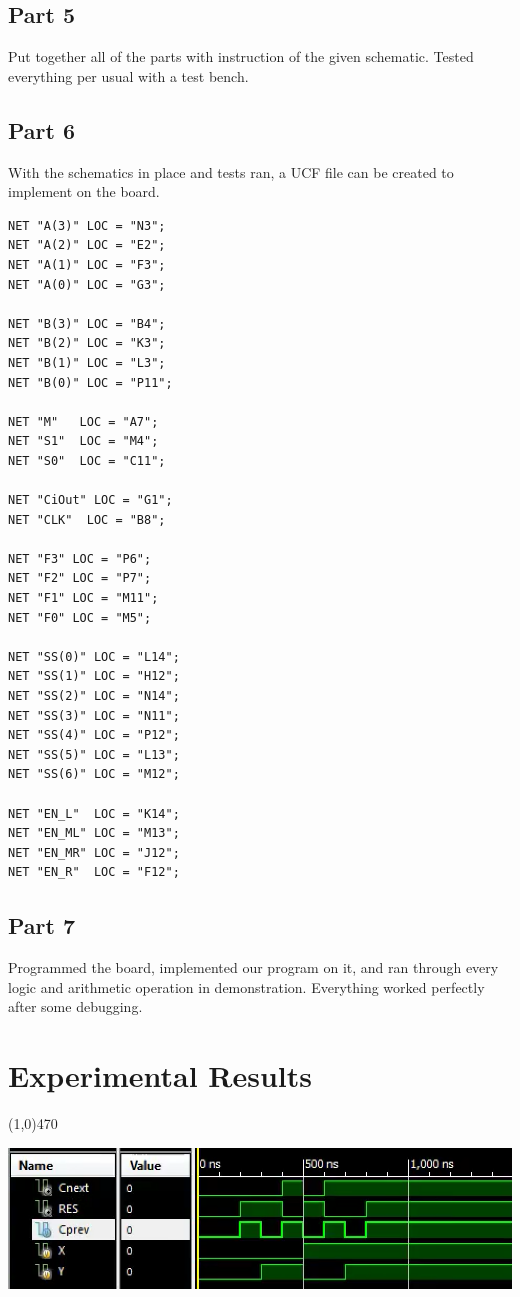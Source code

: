 \documentclass[12pt]{article}
\begin{document}
	\subsection{Part 5}
		Put together all of the parts with instruction of the given schematic. Tested everything per usual with a test bench.
	\subsection{Part 6}
		With the schematics in place and tests ran, a UCF file can be created to implement on the board.
		
		\begin{Verbatim}[frame=single, fontsize=\small]
NET "A(3)" LOC = "N3";
NET "A(2)" LOC = "E2";
NET "A(1)" LOC = "F3";
NET "A(0)" LOC = "G3";

NET "B(3)" LOC = "B4";
NET "B(2)" LOC = "K3";
NET "B(1)" LOC = "L3";
NET "B(0)" LOC = "P11";

NET "M"   LOC = "A7";
NET "S1"  LOC = "M4";
NET "S0"  LOC = "C11";

NET "CiOut" LOC = "G1";
NET "CLK"  LOC = "B8";

NET "F3" LOC = "P6";
NET "F2" LOC = "P7";
NET "F1" LOC = "M11";
NET "F0" LOC = "M5";

NET "SS(0)" LOC = "L14";
NET "SS(1)" LOC = "H12";
NET "SS(2)" LOC = "N14";
NET "SS(3)" LOC = "N11";
NET "SS(4)" LOC = "P12";
NET "SS(5)" LOC = "L13";
NET "SS(6)" LOC = "M12";

NET "EN_L"  LOC = "K14";
NET "EN_ML" LOC = "M13";
NET "EN_MR" LOC = "J12";
NET "EN_R"  LOC = "F12";			
		\end{Verbatim}

	
	\subsection{Part 7}
		Programmed the board, implemented our program on it, and ran through every logic and arithmetic operation in demonstration. Everything worked perfectly after some debugging.
			
\section{Experimental Results}\vspace{-.7cm} \line(1,0){470}

\begin{center}
	\includegraphics[scale=.7]{fa_tb_wave.png}
\end{center}
\end{document}
